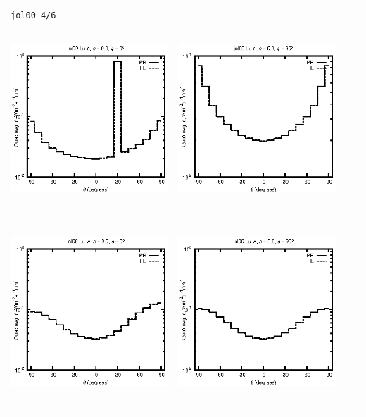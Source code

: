 \begin{tabular}{c c c c}
\multicolumn{4}{l}{\texttt{jol00 4/6}} \\
\includegraphics[height=7cm]{../eps/jol00_Lu_a_fwd.eps} &
\includegraphics[height=7cm]{../eps/jol00_Lu_a_cross.eps}\\
\includegraphics[height=7cm]{../eps/jol00_Lu_w_fwd.eps} &
\includegraphics[height=7cm]{../eps/jol00_Lu_w_cross.eps} \\

\end{tabular}

